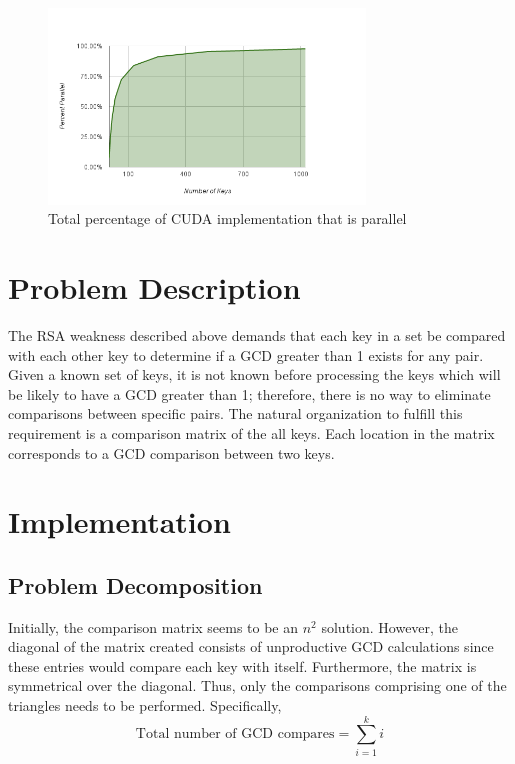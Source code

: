 \documentclass[12pt]{ucthesis}
\begin{document}
\begin{figure}
   \centering
   \includegraphics[width=0.75\textwidth]{chart_7}
   \caption{Total percentage of CUDA implementation that is parallel}
   \label{fig:parPercent}
\end{figure}


\chapter{Problem Description}
\label{sec:probdesc}
The RSA weakness described above demands that each key in a set be 
compared with each other key to determine if a GCD greater than 1 exists for 
any pair. Given a known set of keys, it is not known before processing 
the keys which will be likely to have a GCD greater than 1; therefore, there 
is no way to eliminate comparisons between specific pairs. The natural 
organization to fulfill this requirement is a comparison matrix of the all 
keys. Each location in the matrix corresponds to a GCD comparison between two 
keys.


\chapter{Implementation}
\label{sec:impl}

\section{Problem Decomposition}
\label{subsec:probdecomp}

Initially, the comparison matrix seems to be an $n^2$ solution. However, the 
diagonal of the matrix created consists of unproductive GCD calculations since 
these entries would compare each key with itself. Furthermore, the matrix is 
symmetrical over the diagonal. Thus, only the comparisons comprising one of 
the triangles needs to be performed. Specifically, 
\begin{equation}
   \mbox{Total number of GCD compares} = \sum_{i=1}^k i
   \label{eq:gcd}
\end{equation}
\end{document}
